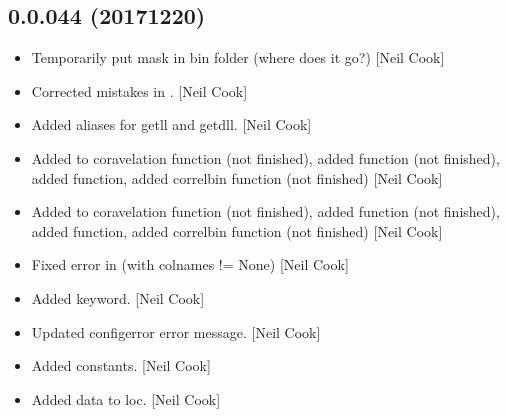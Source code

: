 \documentclass[a4paper,10pt,english]{report}
\begin{document}
\subsection{0.0.044 (2017\sphinxhyphen{}12\sphinxhyphen{}20)}
\label{\detokenize{misc/changelog:id526}}\begin{itemize}
\item {} 
Temporarily put mask in bin folder (where does it go?) {[}Neil Cook{]}

\item {} 
Corrected mistakes in . {[}Neil Cook{]}

\item {} 
Added aliases for getll and getdll. {[}Neil Cook{]}

\item {} 
Added to coravelation function (not finished), added 
function (not finished), added  function, added correlbin
function (not finished) {[}Neil Cook{]}

\item {} 
Added to coravelation function (not finished), added 
function (not finished), added  function, added correlbin
function (not finished) {[}Neil Cook{]}

\item {} 
Fixed error in  (with colnames != None) {[}Neil Cook{]}

\item {} 
Added keyword. {[}Neil Cook{]}

\item {} 
Updated configerror error message. {[}Neil Cook{]}

\item {} 
Added constants. {[}Neil Cook{]}

\item {} 
Added data to loc. {[}Neil Cook{]}

\end{itemize}
\end{document}
